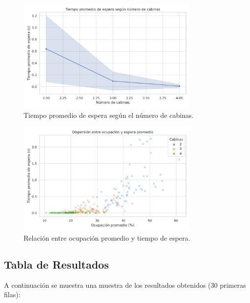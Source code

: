 \documentclass[12pt]{article}
\begin{document}
\begin{figure}[H]
\centering
\includegraphics[width=0.8\textwidth]{line_espera.png}
\caption{Tiempo promedio de espera según el número de cabinas.}
\end{figure}

\begin{figure}[H]
\centering
\includegraphics[width=0.8\textwidth]{scatter_ocupacion.png}
\caption{Relación entre ocupación promedio y tiempo de espera.}
\end{figure}

\subsection*{Tabla de Resultados}
A continuación se muestra una muestra de los resultados obtenidos (30 primeras filas):
\end{document}
